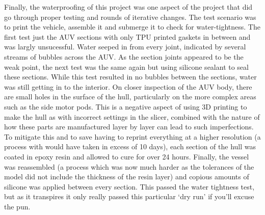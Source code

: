 \documentclass[11pt,a4paper,titlepage]{report}
\begin{document}
	Finally, the waterproofing of this project was one aspect of the project that did go through proper testing and rounds of iterative changes. The test scenario was to print the vehicle, assemble it and submerge it to check for water-tightness. The first test just the AUV sections with only TPU printed gaskets in between and was largly unsucessful. Water seeped in from every joint, indicated by several streams of bubbles across the AUV. As the section joints appeared to be the weak point, the next test was the same again but using silicone sealant to seal these sections. While this test resulted in no bubbles between the sections, water was still getting in to the interior. On closer inspection of the AUV body, there are small holes in the surface of the hull, particularly on the more complex areas such as the side motor pods. This is a negative aspect of using 3D printing to make the hull as with incorrect settings in the slicer, combined with the nature of how these parts are manufactured layer by layer can lead to such imperfections. To mitigate this and to save having to reprint everything at a higher resolution (a process with would have taken in excess of 10 days), each section of the hull was coated in epoxy resin and allowed to cure for over 24 hours. Finally, the vessel was reassembled (a process which was now much harder as the tolerances of the model did not include the thickness of the resin layer) and copious amounts of silicone was applied between every section. This passed the water tightness test, but as it transpires it only really passed this particular `dry run' if you'll excuse the pun. 
	
\end{document}
